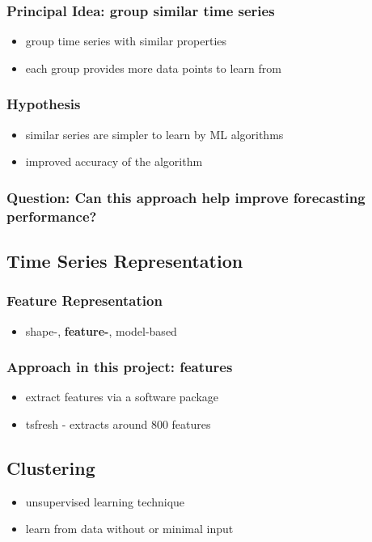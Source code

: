 \documentclass[11pt]{article}
\begin{document}
\subsubsection*{Principal Idea: group similar time series}
\label{sec:orgcc22ac9}
\begin{itemize}
\item group time series with similar properties
\item each group provides more data points to learn from
\end{itemize}
\subsubsection*{Hypothesis}
\label{sec:orgbbc98a6}
\begin{itemize}
\item similar series are simpler to learn by ML algorithms
\item improved accuracy of the algorithm
\end{itemize}
\subsubsection*{Question: Can this approach help improve forecasting performance?}
\label{sec:org002f72b}

\subsection*{Time Series Representation}
\label{sec:orgca2fdef}
\subsubsection*{Feature Representation}
\label{sec:org9f6e1eb}
\begin{itemize}
\item shape-, \textbf{feature-}, model-based
\end{itemize}
\subsubsection*{Approach in this project: features}
\label{sec:org0f5cdc9}
\begin{itemize}
\item extract features via a software package
\item tsfresh - extracts around 800 features
\end{itemize}
\subsection*{Clustering}
\label{sec:orgc636b58}
\begin{itemize}
\item unsupervised learning technique
\item learn from data without or minimal input
\end{itemize}
\end{document}
